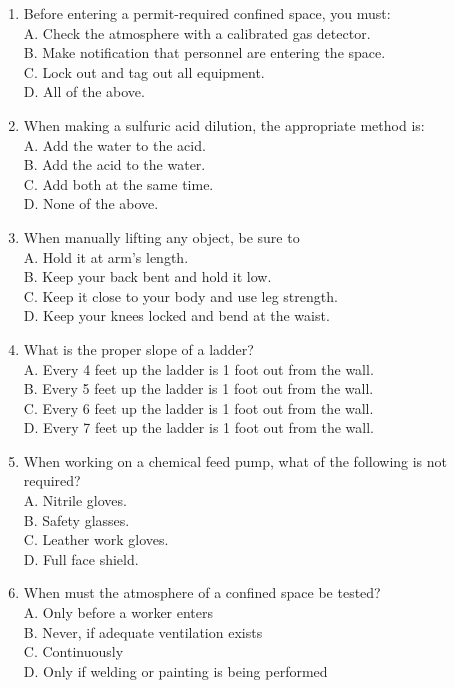 \documentclass{article}
\begin{document}
\begin{enumerate}
\item Before entering a permit-required confined space, you must:\\
A. Check the atmosphere with a calibrated gas detector.\\
B. Make notification that personnel are entering the space.\\
C. Lock out and tag out all equipment.\\
D. All of the above.
	 
\item When making a sulfuric acid dilution, the appropriate method is:\\
A. Add the water to the acid.\\
B. Add the acid to the water.\\
C. Add both at the same time.\\
D. None of the above.

\item When manually lifting any object, be sure to\\
A. Hold it at arm's length.\\
B. Keep your back bent and hold it low.\\
C. Keep it close to your body and use leg strength.\\
D. Keep your knees locked and bend at the waist.


\item What is the proper slope of a ladder?\\
A.	Every 4 feet up the ladder is 1 foot out from the wall.\\
B.	Every 5 feet up the ladder is 1 foot out from the wall. \\
C.	Every 6 feet up the ladder is 1 foot out from the wall.\\
D.	Every 7 feet up the ladder is 1 foot out from the wall.


\item When working on a chemical feed pump, what of the following is not required?\\
A.	Nitrile gloves.\\
B.	Safety glasses.\\
C.	Leather work gloves.\\
D.	Full face shield.

\item When must the atmosphere of a confined space be tested?\\
A.	Only before a worker enters\\
B.	Never, if adequate ventilation exists\\
C.	Continuously\\
D.	Only if welding or painting is being performed


\end{enumerate}
\end{document}
